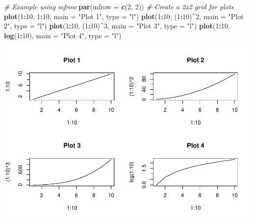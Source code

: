\documentclass[
]{book}
\newenvironment{Shaded}{\begin{snugshade}}{\end{snugshade}}
\newcommand{\AttributeTok}[1]{\textcolor[rgb]{0.13,0.29,0.53}{#1}}
\newcommand{\CommentTok}[1]{\textcolor[rgb]{0.56,0.35,0.01}{\textit{#1}}}
\newcommand{\DecValTok}[1]{\textcolor[rgb]{0.00,0.00,0.81}{#1}}
\newcommand{\FunctionTok}[1]{\textcolor[rgb]{0.13,0.29,0.53}{\textbf{#1}}}
\newcommand{\NormalTok}[1]{#1}
\newcommand{\SpecialCharTok}[1]{\textcolor[rgb]{0.81,0.36,0.00}{\textbf{#1}}}
\newcommand{\StringTok}[1]{\textcolor[rgb]{0.31,0.60,0.02}{#1}}
\begin{document}
\begin{Shaded}
\begin{Highlighting}[]
\CommentTok{\# Example using mfrow}
\FunctionTok{par}\NormalTok{(}\AttributeTok{mfrow =} \FunctionTok{c}\NormalTok{(}\DecValTok{2}\NormalTok{, }\DecValTok{2}\NormalTok{)) }\CommentTok{\# Create a 2x2 grid for plots}
\FunctionTok{plot}\NormalTok{(}\DecValTok{1}\SpecialCharTok{:}\DecValTok{10}\NormalTok{, }\DecValTok{1}\SpecialCharTok{:}\DecValTok{10}\NormalTok{, }\AttributeTok{main =} \StringTok{"Plot 1"}\NormalTok{, }\AttributeTok{type =} \StringTok{"l"}\NormalTok{)}
\FunctionTok{plot}\NormalTok{(}\DecValTok{1}\SpecialCharTok{:}\DecValTok{10}\NormalTok{, (}\DecValTok{1}\SpecialCharTok{:}\DecValTok{10}\NormalTok{)}\SpecialCharTok{\^{}}\DecValTok{2}\NormalTok{, }\AttributeTok{main =} \StringTok{"Plot 2"}\NormalTok{, }\AttributeTok{type =} \StringTok{"l"}\NormalTok{)}
\FunctionTok{plot}\NormalTok{(}\DecValTok{1}\SpecialCharTok{:}\DecValTok{10}\NormalTok{, (}\DecValTok{1}\SpecialCharTok{:}\DecValTok{10}\NormalTok{)}\SpecialCharTok{\^{}}\DecValTok{3}\NormalTok{, }\AttributeTok{main =} \StringTok{"Plot 3"}\NormalTok{, }\AttributeTok{type =} \StringTok{"l"}\NormalTok{)}
\FunctionTok{plot}\NormalTok{(}\DecValTok{1}\SpecialCharTok{:}\DecValTok{10}\NormalTok{, }\FunctionTok{log}\NormalTok{(}\DecValTok{1}\SpecialCharTok{:}\DecValTok{10}\NormalTok{), }\AttributeTok{main =} \StringTok{"Plot 4"}\NormalTok{, }\AttributeTok{type =} \StringTok{"l"}\NormalTok{)}
\end{Highlighting}
\end{Shaded}

\includegraphics{_main_files/figure-latex/unnamed-chunk-47-1.pdf}
\end{document}
